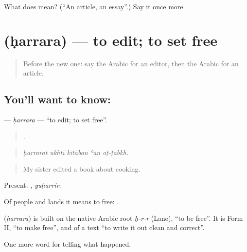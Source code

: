 \begin{tcolorbox}[breakable,colback=teal!4,colframe=teal!35!black,title={Before you move on}]
What does  mean? (\textquotedblleft{}An article, an essay\textquotedblright{}.) Say it once more.
\end{tcolorbox}
\section[\texorpdfstring{\ar{حرر} (ḥarrara)}{حرر (ḥarrara)}]{ (ḥarrara) — to edit; to set free}

\label{lesson:AR-C296-harrara}



\begin{quote}
Before the new one: say the Arabic for an editor, then the Arabic for an article.
\end{quote}

\subsection*{You'll want to know: }
\textbf{} — \emph{ḥarrara} — \textquotedblleft{}to edit; to set free\textquotedblright{}.

\begin{quote}
    .
\end{quote}

\begin{quote}
\emph{ḥarrarat ukhtī kitāban ʿan aṭ-ṭabkh.}
\end{quote}

\begin{quote}
My sister edited a book about cooking.
\end{quote}

Present: , \emph{yuḥarrir}.

Of people and lands it means to free:   .

\begin{cousinweb}
\textbf{} (\emph{ḥarrara}) is built on the native Arabic root \emph{ḥ-r-r} (Lane), \textquotedblleft{}to be free\textquotedblright{}. It is Form II, \textquotedblleft{}to make free\textquotedblright{}, and of a text \textquotedblleft{}to write it out clean and correct\textquotedblright{}.
\end{cousinweb}

\begin{grammarlens}[title={What you've built}]
One more word for telling what happened.
\end{grammarlens}

